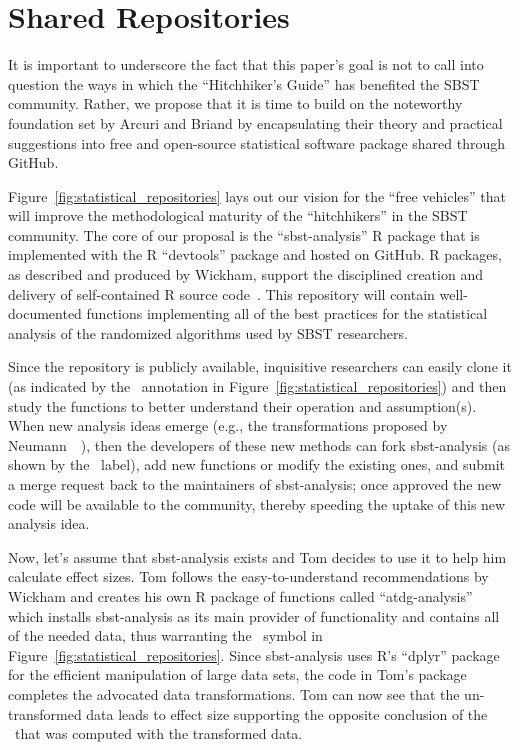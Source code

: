 
\vspace*{-.5em}

\section{Shared Repositories}
\label{sec:repositories}



It is important to underscore the fact that this paper's goal is not to call into question the ways in which the
``Hitchhiker's Guide'' has benefited the SBST community. Rather, we propose that it is time to build on the noteworthy
foundation set by Arcuri and Briand by encapsulating their theory and practical suggestions into free and open-source
statistical software package shared through GitHub.

Figure~\ref{fig:statistical_repositories} lays out our vision for the ``free vehicles'' that will improve the
methodological maturity of the ``hitchhikers'' in the SBST community. The core of our proposal is the ``sbst-analysis''
R package that is implemented with the R ``devtools'' package and hosted on GitHub. R packages, as described and
produced by Wickham, support the disciplined creation and delivery of self-contained R source
code~\cite{Wickham2015}. This repository will contain well-documented functions implementing all of the best practices
for the statistical analysis of the randomized algorithms used by SBST researchers.

Since the repository is publicly available, inquisitive researchers can easily clone it (as indicated by the
\codecopygit~annotation in Figure~\ref{fig:statistical_repositories}) and then study the functions to better understand
their operation and assumption(s). When new analysis ideas emerge (e.g., the transformations proposed by
Neumann~\etal~\cite{Neumann2015}), then the developers of these new methods can fork sbst-analysis (as shown by the
\codeforkgit~label), add new functions or modify the existing ones, and submit a merge request back to the maintainers
of sbst-analysis; once approved the new code will be available to the community, thereby speeding the uptake of this new
analysis idea.

Now, let's assume that sbst-analysis exists and Tom decides to use it to help him calculate effect sizes. Tom follows
the easy-to-understand recommendations by Wickham and creates his own R package of functions called ``atdg-analysis''
which installs sbst-analysis as its main provider of functionality and contains all of the needed data, thus warranting
the \codedatagit~symbol in Figure~\ref{fig:statistical_repositories}. Since sbst-analysis uses R's ``dplyr'' package for
the efficient manipulation of large data sets, the code in Tom's package completes the advocated data transformations.
Tom can now see that the un-transformed data leads to effect size supporting the opposite conclusion of the
\atwelve~that was computed with the transformed data.


